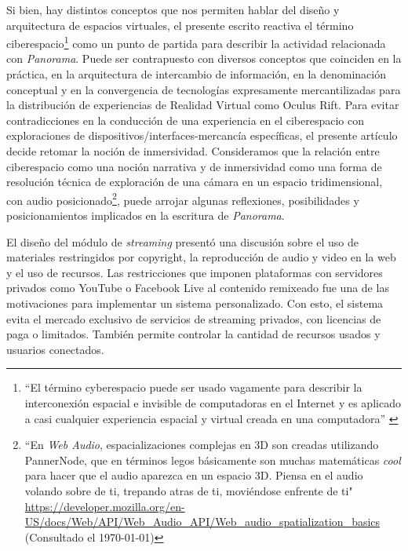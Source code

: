 Si bien, hay distintos conceptos que nos permiten hablar del diseño y arquitectura de espacios virtuales, el presente escrito reactiva el término ciberespacio\footnote{``El término cyberespacio puede ser usado vagamente para describir la interconexión espacial e invisible de computadoras en el Internet y es aplicado a casi cualquier experiencia espacial y virtual creada en una computadora'' \citep{cyberspace}} como un punto de partida para describir la actividad relacionada con \textit{Panorama}. Puede ser contrapuesto con diversos conceptos que coinciden en la práctica, en la arquitectura de intercambio de información, en la denominación conceptual y en la convergencia de tecnologías expresamente mercantilizadas para la distribución de experiencias de Realidad Virtual como Oculus Rift. Para evitar contradicciones en la conducción de una experiencia en el ciberespacio con exploraciones de dispositivos/interfaces-mercancía específicas, el presente artículo decide retomar la noción de inmersividad. Consideramos que la relación entre ciberespacio como una noción narrativa y de inmersividad como una forma de resolución técnica de exploración de una cámara en un espacio tridimensional, con audio posicionado\footnote{``En \textit{Web Audio}, espacializaciones complejas en 3D son creadas utilizando PannerNode, que en términos legos básicamente son muchas matemáticas \textit{cool} para hacer que el audio aparezca en un espacio 3D. Piensa en el audio volando sobre de ti, trepando atras de ti, moviéndose enfrente de ti" \url{https://developer.mozilla.org/en-US/docs/Web/API/Web_Audio_API/Web_audio_spatialization_basics} (Consultado el \today)}, puede arrojar algunas reflexiones, posibilidades y posicionamientos implicados en la escritura de \textit{Panorama}. %
\color{black}

El diseño del módulo de \textit{streaming} presentó una discusión sobre el uso de materiales restringidos por copyright, la reproducción de audio y video en la web y el uso de recursos. Las restricciones que imponen plataformas con servidores privados como YouTube o Facebook Live al contenido remixeado fue una de las motivaciones para implementar un sistema personalizado. Con esto, el sistema evita el mercado exclusivo de servicios de streaming privados, con licencias de paga o limitados. También permite controlar la cantidad de recursos usados y usuarios conectados. %


